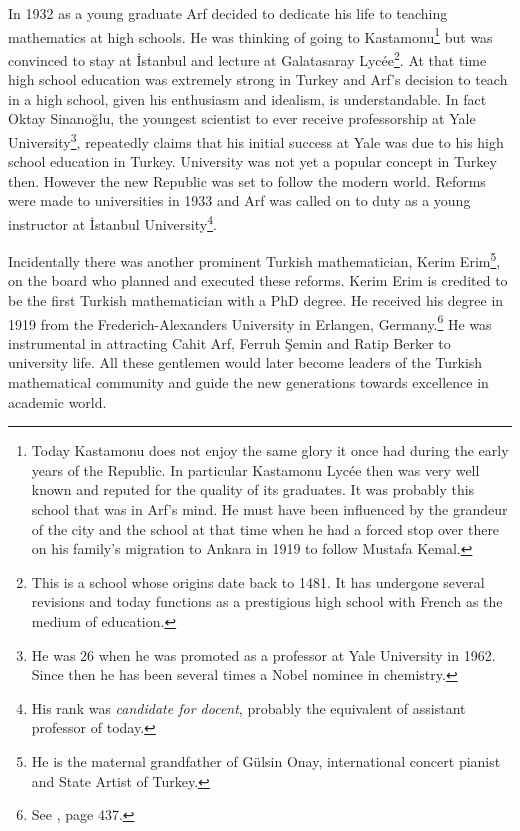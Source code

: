 \documentclass[12pt]{amsart}
\begin{document}
In 1932 as a young  graduate  Arf decided to dedicate his life  to teaching mathematics at high schools. He was thinking of going to Kastamonu\footnote{Today Kastamonu does not enjoy the same glory it once had during the early years of the Republic. In particular Kastamonu Lyc\'{e}e then was very well known and reputed for the quality of its graduates. It was probably this school that was in Arf's mind. He must have been influenced by the grandeur of the city and the school at that time when he had a forced stop over there on his family's migration to Ankara in 1919 to follow Mustafa Kemal.} but was convinced to stay at {\.I}stanbul and lecture at Galatasaray Lyc\'{e}e\footnote{This is a school whose origins date back to 1481. It has undergone several revisions and today functions as a prestigious high school with French as the medium of education.}. At that time high school education was extremely strong in Turkey and Arf's decision to teach in a high school, given his enthusiasm and idealism, is understandable. In fact Oktay Sinano\u{g}lu, the youngest scientist to ever receive professorship at Yale University\footnote{He was 26 when he was promoted as a professor at Yale University in 1962. Since then he has been several times a Nobel nominee  in chemistry.}, repeatedly claims that his initial success at Yale was due to his high school education in Turkey. University was not yet a popular concept in Turkey then. However the new Republic was set to follow the modern world. Reforms were made to universities in 1933 and Arf was called on to duty as a young instructor at {\.I}stanbul University\footnote{His rank was \emph{candidate for docent}, probably the equivalent of assistant professor of today.}.

Incidentally there was another prominent Turkish mathematician, Kerim Erim\footnote{He is the maternal grandfather of G\"{u}lsin Onay, international concert pianist and State Artist of Turkey.}, on the board who planned and executed these reforms. Kerim Erim is credited to be the first Turkish mathematician with a PhD degree. He received his degree in 1919 from the Frederich-Alexanders University in Erlangen, Germany.\footnote{See \cite{alp}, page 437.} He was instrumental in attracting Cahit Arf, Ferruh \c{S}emin and Ratip Berker to university life. All these gentlemen would later become leaders of the Turkish mathematical community and guide the new generations towards excellence in academic world.
\end{document}
